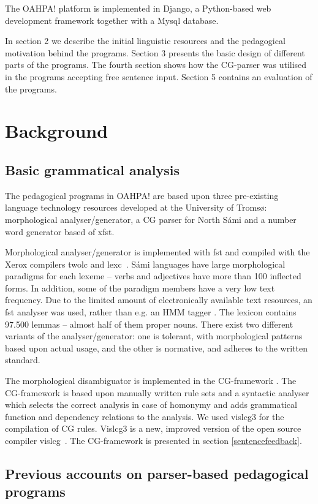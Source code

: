 \documentclass[11pt]{article}
\begin{document}
The OAHPA! platform is implemented in Django, a Python-based web development framework together with a Mysql database.

In section 2 we describe the initial linguistic resources and the pedagogical motivation behind the programs. Section 3 presents the basic design of different parts of the programs. The fourth section shows how the CG-parser was utilised in the programs accepting free sentence input. Section 5 contains an evaluation of the programs.


\section{Background}

\subsection{Basic grammatical analysis}
The pedagogical programs in OAHPA! are based upon three pre-existing language technology resources developed at the University of Tromsø: morphological analyser/generator, a CG parser for North Sámi and a number word generator based of xfst.

Morphological analyser/generator is implemented with fst and compiled with the Xerox compilers twolc and lexc~\cite{BeesleyKarttunen:03}. Sámi languages have large morphological paradigms for each lexeme -- verbs and adjectives have more than 100 inflected forms. In addition, some of the paradigm members have a very low text frequency. Due to the limited amount of electronically available text resources, an fst analyser was used, rather than e.g. an HMM tagger \cite{Trosterud:07}. The lexicon contains 97.500 lemmas -- almost half of them proper nouns. There exist two different variants of the analyser/generator: one is tolerant, with morphological patterns based upon actual usage, and the other is normative, and adheres to the written standard.  

The morphological disambiguator is implemented in the CG-framework \cite{Karlsson:95}. The CG-framework is based upon manually written rule sets and a syntactic analyser which selects the correct analysis in case of homonymy and adds grammatical function and dependency relations to the analysis. We used vislcg3 for the compilation of CG rules. Vislcg3 is a new, improved version of the open source compiler vislcg~\cite{Visl:08}. The CG-framework is presented in section \ref{sentencefeedback}. 

\subsection{Previous accounts on parser-based pedagogical programs}
\end{document}
